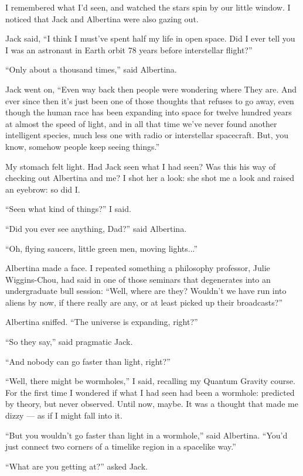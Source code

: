 \documentclass[english,11pt,letterpaper,onecolumn]{scrbook}
\begin{document}
	I remembered what I'd seen, and watched the stars spin by our little window.  I noticed that Jack and Albertina were also gazing out.

	Jack said, ``I think I must've spent half my life in open space.  Did I ever tell you I was an astronaut in Earth orbit 78 years before interstellar flight?''

	``Only about a thousand times,'' said Albertina.

	Jack went on, ``Even way back then people were wondering where They are.  And ever since then it's just been one of those thoughts that refuses to go away, even though the human race has been expanding into space for twelve hundred years at almost the speed of light, and in all that time we've never found another intelligent species, much less one with radio or interstellar spacecraft.  But, you know, somehow people keep seeing things.''

	My stomach felt light.  Had Jack seen what I had seen?  Was this his way of checking out Albertina and me?  I shot her a look:  she shot me a look and raised an eyebrow:  so did I.

	``Seen what kind of things?'' I said.

	``Did you ever see anything, Dad?'' said Albertina.

	``Oh, flying saucers, little green men, moving lights...''

	Albertina made a face.  I repeated something a philosophy professor, Julie Wiggins-Chou, had said in one of those seminars that degenerates into an undergraduate bull session:  ``Well, where are they?  Wouldn't we have run into aliens by now, if there really are any, or at least picked up their broadcasts?''

	Albertina sniffed.  ``The universe is expanding, right?''

	``So they say,'' said pragmatic Jack.

	``And nobody can go faster than light, right?''

	``Well, there might be wormholes,'' I said, recalling my Quantum Gravity course.  For the first time I wondered if what I had seen had been a wormhole:  predicted by theory, but never observed.  Until now, maybe.  It was a thought that made me dizzy --- as if I might fall into it.

	``But you wouldn't go faster than light in a wormhole,'' said Albertina.  ``You'd just connect two corners of a timelike region in a spacelike way.''

	``What are you getting at?'' asked Jack.
\end{document}
